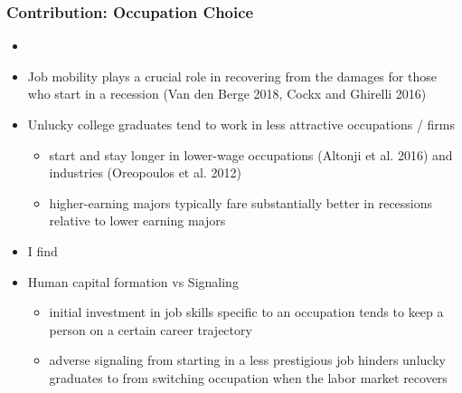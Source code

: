\documentclass[11pt]{beamer}
\begin{document}
\begin{frame}
	\frametitle{Contribution: Occupation Choice} 
	\begin{itemize}
				\item {\color{red}{rewriting!}}
		\item Job mobility plays a crucial role in recovering from the damages for those who start in a recession (Van den Berge 2018, Cockx and Ghirelli 2016) 
		\item Unlucky college graduates tend to work in less attractive occupations / firms
		\begin{itemize}
			\item start and stay longer in lower-wage occupations (Altonji et al. 2016) and industries (Oreopoulos et al.
			2012)
			\item higher-earning majors typically fare substantially
			better in recessions relative to lower earning majors
		\end{itemize}
		\item I find 
		\item Human capital formation vs Signaling 
			\begin{itemize}
				\item initial investment in job skills specific to an occupation tends to keep a person on a certain career trajectory
				\item adverse signaling from starting in a less prestigious job hinders unlucky graduates to from switching occupation when the labor market recovers
			\end{itemize}		
	\end{itemize}
\end{frame}


\end{document}
